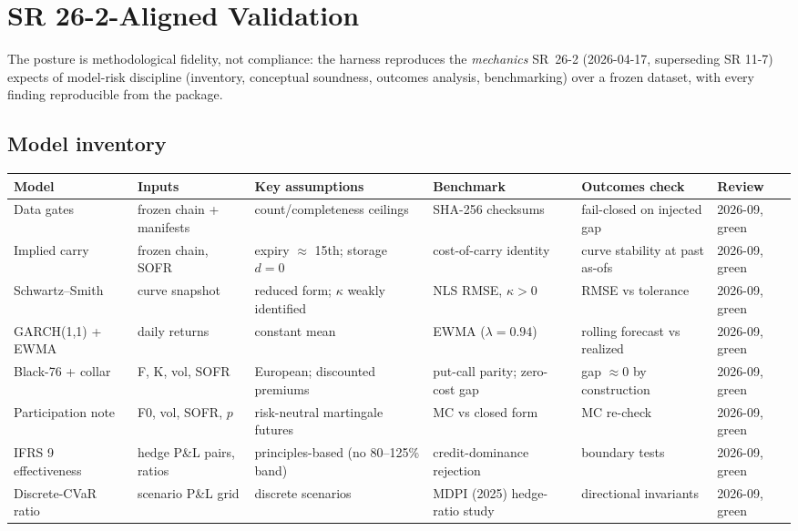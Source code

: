 \documentclass[11pt,a4paper]{article}
\begin{document}
\section{SR 26-2-Aligned Validation}\label{sec:validation}

The posture is methodological fidelity, not compliance: the harness
reproduces the \emph{mechanics} SR~26-2 (2026-04-17, superseding SR 11-7)
expects of model-risk discipline (inventory, conceptual soundness,
outcomes analysis, benchmarking) over a frozen dataset, with every
finding reproducible from the package.

\subsection{Model inventory}

\begin{table}[h!]\label{tab:inventory}
\centering\scriptsize
\begin{tabular}{p{2.7cm}p{2.5cm}p{3.4cm}p{3.2cm}p{2.7cm}p{1.5cm}}
\toprule
\textbf{Model} & \textbf{Inputs} & \textbf{Key assumptions} & \textbf{Benchmark} & \textbf{Outcomes check} & \textbf{Review} \\
\midrule
Data gates & frozen chain + manifests & count/completeness ceilings & SHA-256 checksums & fail-closed on injected gap & 2026-09, green \\
Implied carry & frozen chain, SOFR & expiry $\approx$ 15th; storage $d=0$ & cost-of-carry identity & curve stability at past as-ofs & 2026-09, green \\
Schwartz--Smith & curve snapshot & reduced form; $\kappa$ weakly identified & NLS RMSE, $\kappa>0$ & RMSE vs tolerance & 2026-09, green \\
GARCH(1,1) + EWMA & daily returns & constant mean & EWMA ($\lambda=0.94$) & rolling forecast vs realized & 2026-09, green \\
Black-76 + collar & F, K, vol, SOFR & European; discounted premiums & put-call parity; zero-cost gap & gap $\approx 0$ by construction & 2026-09, green \\
Participation note & F0, vol, SOFR, $p$ & risk-neutral martingale futures & MC vs closed form & MC re-check & 2026-09, green \\
IFRS 9 effectiveness & hedge P\&L pairs, ratios & principles-based (no 80--125\% band) & credit-dominance rejection & boundary tests & 2026-09, green \\
Discrete-CVaR ratio & scenario P\&L grid & discrete scenarios & MDPI (2025) hedge-ratio study & directional invariants & 2026-09, green \\

\end{tabular}
\end{table}
\end{document}
